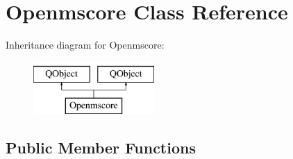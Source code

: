\hypertarget{class_openmscore}{}\section{Openmscore Class Reference}
\label{class_openmscore}
Inheritance diagram for Openmscore\+:\begin{figure}[H]
\begin{center}
\leavevmode
\includegraphics[height=2.000000cm]{class_openmscore}
\end{center}
\end{figure}
\subsection*{Public Member Functions}
